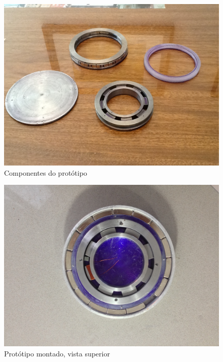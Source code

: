 \begin{figure}[ht!]
\centering
\includegraphics[width=0.8\linewidth]{Figs/img/partes}
\caption{Componentes do protótipo}
\label{fig:partes}
\end{figure}


\begin{figure}[ht!]
\centering
\includegraphics[width=0.8\linewidth]{Figs/img/completo}
\caption{Protótipo montado, vista superior}
\label{fig:completo}
\end{figure}


